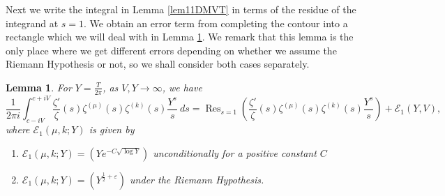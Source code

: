 \documentclass[12pt, a4paper,reqno]{amsart}
\DeclareMathOperator*{\res}{Res}
\newtheorem{lemma}{Lemma}
\theoremstyle{definition}
\numberwithin{equation}{section}
\begin{document}
Next we write the integral in Lemma \ref{lem11DMVT} in terms of the residue of the integrand at $s=1$. We obtain an error term from completing the contour into a rectangle which we will deal with in Lemma \ref{lem12DMVT}. We remark that this lemma is the only place where we get different errors depending on whether we assume the Riemann Hypothesis or not, so we shall consider both cases separately.

\begin{lemma}\label{lem12DMVT}
    For $Y=\frac{T}{2\pi}$, as $V,Y\to\infty$, we have \begin{equation*}
        \frac{1}{2\pi i}\int_{c-iV}^{c+iV}\frac{\zeta'}{\zeta}(s)\zeta^{(\mu)}(s)\zeta^{(k)}(s)\frac{Y^s}{s}\ ds=\res_{s=1}\left(\frac{\zeta'}{\zeta}(s)\zeta^{(\mu)}(s)\zeta^{(k)}(s)\frac{Y^s}{s}\right)+\mathcal{E}_1(Y,V),
    \end{equation*}
    where $\mathcal{E}_1(\mu,k;Y)$ is given by \begin{enumerate}
        \item $\mathcal{E}_1(\mu,k;Y) = \left( Ye^{-C\sqrt{\log Y}}\right)$ unconditionally for a positive constant $C$
        \item $\mathcal{E}_1(\mu,k;Y) = \left( Y^{\frac{1}{2}+\varepsilon}\right)$ under the Riemann Hypothesis.
    \end{enumerate}
\end{lemma}
\end{document}
